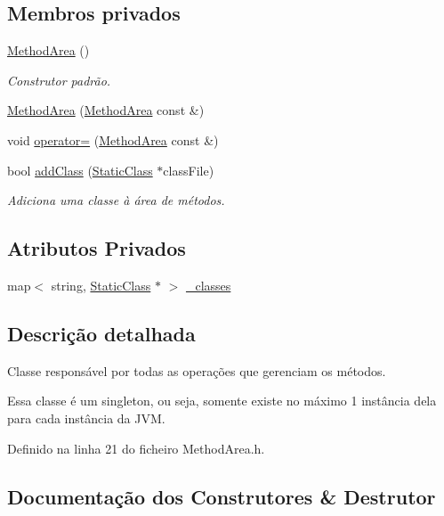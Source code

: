 \subsection*{Membros privados}
\begin{DoxyCompactItemize}
\item 
\hyperlink{classMethodArea_a6e9aac39975424e6c0ab3c29535aca75}{Method\+Area} ()
\begin{DoxyCompactList}\small\item\em Construtor padrão. \end{DoxyCompactList}\item 
\hyperlink{classMethodArea_a3a51cf2f998faa40ff46f17019f59e0a}{Method\+Area} (\hyperlink{classMethodArea}{Method\+Area} const \&)
\item 
void \hyperlink{classMethodArea_a02652b16a9bc28ceae405a9959cf4ee8}{operator=} (\hyperlink{classMethodArea}{Method\+Area} const \&)
\item 
bool \hyperlink{classMethodArea_a9e4e378de46c1a9836820d86cd9dadb8}{add\+Class} (\hyperlink{classStaticClass}{Static\+Class} $\ast$class\+File)
\begin{DoxyCompactList}\small\item\em Adiciona uma classe à área de métodos. \end{DoxyCompactList}\end{DoxyCompactItemize}
\subsection*{Atributos Privados}
\begin{DoxyCompactItemize}
\item 
map$<$ string, \hyperlink{classStaticClass}{Static\+Class} $\ast$ $>$ \hyperlink{classMethodArea_a1244d392d351920d754db8c6940dd7aa}{\+\_\+classes}
\end{DoxyCompactItemize}


\subsection{Descrição detalhada}
Classe responsável por todas as operações que gerenciam os métodos. 

Essa classe é um singleton, ou seja, somente existe no máximo 1 instância dela para cada instância da J\+VM. 

Definido na linha 21 do ficheiro Method\+Area.\+h.



\subsection{Documentação dos Construtores \& Destrutor}
\mbox{\label{classMethodArea_a79edf80f07f068f918907d8e2a3508b7}} 
